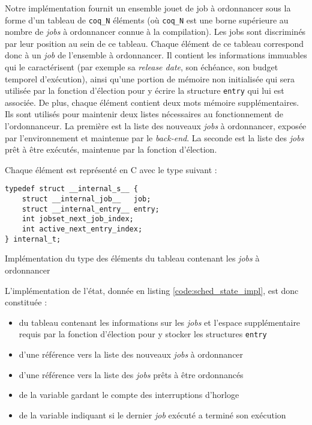	Notre implémentation fournit un ensemble jouet de job à ordonnancer sous la forme d'un tableau de \texttt{coq\_N} éléments (où \texttt{coq\_N} est une borne supérieure au nombre de \emph{jobs} à ordonnancer connue à la compilation). Les jobs sont discriminés par leur position au sein de ce tableau. Chaque élément de ce tableau correspond donc à un \emph{job} de l'ensemble à ordonnancer. Il contient les informations immuables qui le caractérisent (par exemple sa \emph{release date}, son échéance, son budget temporel d'exécution), ainsi qu'une portion de mémoire non initialisée qui sera utilisée par la fonction d'élection pour y écrire la structure \texttt{entry} qui lui est associée. De plus, chaque élément contient deux mots mémoire supplémentaires. Ils sont utilisés pour maintenir deux listes nécessaires au fonctionnement de l'ordonnanceur. La première est la liste des nouveaux \emph{jobs} à ordonnancer, exposée par l'environnement et maintenue par le \emph{back-end}. La seconde est la liste des \emph{jobs} prêt à être exécutés, maintenue par la fonction d'élection.

	Chaque élément est représenté en C avec le type suivant :
	\begin{listing}[!hb]
	\begin{verbatim}
typedef struct __internal_s__ {
    struct __internal_job__   job;
    struct __internal_entry__ entry;
    int jobset_next_job_index;
    int active_next_entry_index;
} internal_t;
	\end{verbatim}
	\caption{Implémentation du type des éléments du tableau contenant les \emph{jobs} à ordonnancer}
	\label{code:array_elem_impl}
	\end{listing}

	L'implémentation de l'état, donnée en listing \ref{code:sched_state_impl}, est donc constituée :
	\begin{itemize}
		\item du tableau contenant les informations sur les \emph{jobs} et l'espace supplémentaire requis par la fonction d'élection pour y stocker les structures \texttt{entry}
		\item d'une référence vers la liste des nouveaux \emph{jobs} à ordonnancer
		\item d'une référence vers la liste des \emph{jobs} prêts à être ordonnancés
		\item de la variable gardant le compte des interruptions d'horloge
		\item de la variable indiquant si le dernier \emph{job} exécuté a terminé son exécution
	\end{itemize}

